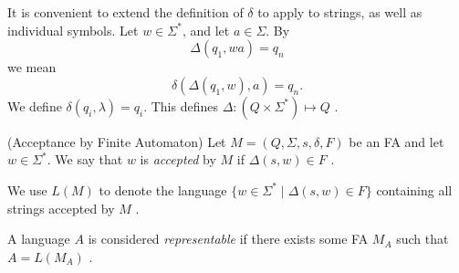\documentclass{bcthesis}
\newcommand{\footcite}[2]{\xspace\cite[pg.~{#2}]{#1}\xspace}
\begin{document}
	\begin{remark}
		It is convenient to extend the definition of $\delta$ to apply to strings, as well as individual symbols.
		Let $w \in \Sigma^*$, and let $a \in \Sigma$.
		By 
		\[
			\Delta(q_1, wa) = q_n
		\] 
		we mean 
		\[
			\delta( \Delta(q_1, w), a) = q_n.
		\]
		We define $\delta(q_i, \lambda) = q_i$.
		This defines $\Delta: (Q \times \Sigma^*) \mapsto Q$ \footcite{hopcroft}{17}.
	\end{remark}

	\begin{definition}(Acceptance by Finite Automaton)
		Let $M = (Q, \Sigma, s, \delta, F)$ be an FA and let $w \in \Sigma^*$.
		We say that $w$ is \textit{accepted} by $M$ if $\Delta(s, w) \in F$ \footcite{hopcroft}{18}.

		We use $L(M)$ to denote the language $\{ w \in \Sigma^* \mid \Delta(s, w) \in F \}$ containing all strings accepted by $M$ \footcite{hopcroft}{18}.

		A language $A$ is considered \textit{representable} if there exists some FA $M_A$ such that $A = L(M_A)$ \footcite{salomaa}{20}.
	\end{definition}
\end{document}

